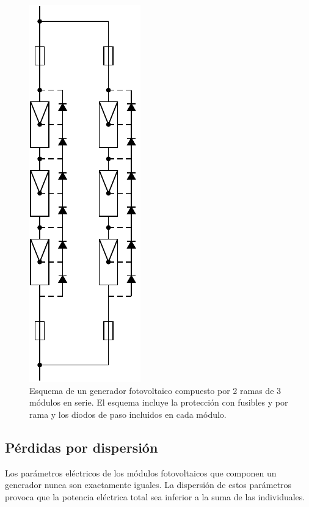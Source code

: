 \begin{figure}
\begin{centering}
\includegraphics[angle=270]{../figs/AsociacionModulos}
\end{centering}

\caption{Esquema de un generador fotovoltaico compuesto por 2 ramas de 3 módulos
en serie. El esquema incluye la protección con fusibles y por rama
y los diodos de paso incluidos en cada módulo.\label{fig:EsquemaGenerador}}

\end{figure}


\subsection{Pérdidas por dispersión}

Los parámetros eléctricos de los módulos fotovoltaicos que componen
un generador nunca son exactamente iguales. La dispersión de estos
parámetros provoca que la potencia eléctrica total sea inferior a
la suma de las individuales.

